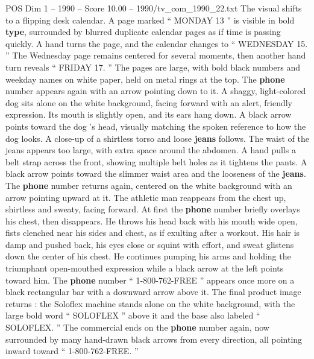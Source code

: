 \begin{textsample}{POS Dim 1 – 1990 – Score 10.00 – 1990/tv\_com\_1990\_22.txt}
The visual shifts to a flipping desk calendar.
A page marked “ MONDAY 13 ” is visible in bold \textbf{type}, surrounded by blurred duplicate calendar pages as if time is passing quickly.
A hand turns the page, and the calendar changes to “ WEDNESDAY 15. ” The Wednesday page remains centered for several moments, then another hand turn reveals “ FRIDAY 17. ” The pages are large, with bold black numbers and weekday names on white paper, held on metal rings at the top.
The \textbf{phone} number appears again with an arrow pointing down to it.
A shaggy, light-colored dog sits alone on the white background, facing forward with an alert, friendly expression.
Its mouth is slightly open, and its ears hang down.
A black arrow points toward the dog ’s head, visually matching the spoken reference to how the dog looks.
A close-up of a shirtless torso and loose \textbf{jeans} follows.
The waist of the jeans appears too large, with extra space around the abdomen.
A hand pulls a belt strap across the front, showing multiple belt holes as it tightens the pants.
A black arrow points toward the slimmer waist area and the looseness of the \textbf{jeans}.
The \textbf{phone} number returns again, centered on the white background with an arrow pointing upward at it.
The athletic man reappears from the chest up, shirtless and sweaty, facing forward.
At first the \textbf{phone} number briefly overlays his chest, then disappears.
He throws his head back with his mouth wide open, fists clenched near his sides and chest, as if exulting after a workout.
His hair is damp and pushed back, his eyes close or squint with effort, and sweat glistens down the center of his chest.
He continues pumping his arms and holding the triumphant open-mouthed expression while a black arrow at the left points toward him.
The \textbf{phone} number “ 1-800-762-FREE ” appears once more on a black rectangular bar with a downward arrow above it.
The final product image returns : the Soloflex machine stands alone on the white background, with the large bold word “ SOLOFLEX ” above it and the base also labeled “ SOLOFLEX. ” The commercial ends on the \textbf{phone} number again, now surrounded by many hand-drawn black arrows from every direction, all pointing inward toward “ 1-800-762-FREE. ”

\end{textsample}
